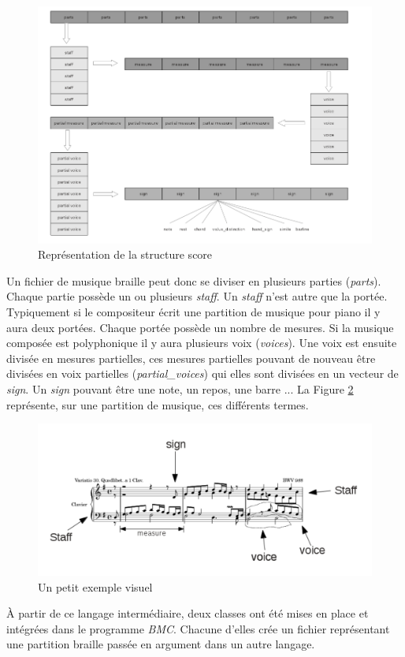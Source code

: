 \begin{figure}[h]
  \centering
  \includegraphics[width=1\textwidth]{images/bmc-score.png}
  \caption{Représentation de la structure score}
  \label{score}
\end{figure}

 Un fichier de musique braille peut donc se diviser en
plusieurs parties (\textit{parts}). Chaque partie possède un ou plusieurs
\textit{staff}. Un \textit{staff} n'est autre que la portée. Typiquement si le
compositeur écrit une partition de musique pour piano il y aura deux
portées. Chaque portée possède un nombre de mesures. Si la musique
composée est polyphonique il y aura plusieurs voix (\textit{voices}). Une
voix est ensuite divisée en mesures partielles, ces mesures partielles
pouvant de nouveau être divisées en voix partielles (\textit{partial\_voices}) qui elles
sont divisées en un vecteur de \textit{sign}. Un \textit{sign} pouvant être une
note, un repos, une barre ... La Figure \ref{musicexe} représente, sur
une partition de musique, ces différents termes.


\begin{figure}[!h]
  \includegraphics[width=1\textwidth]{images/score-visu.png}
  \caption{Un petit exemple visuel}
  \label{musicexe}
\end{figure}

À partir de ce langage intermédiaire, deux classes ont été mises en place et intégrées dans le programme \textit{BMC}. Chacune d'elles
crée un fichier représentant une partition braille passée en argument
dans un autre langage.

